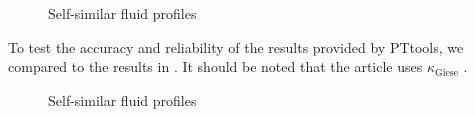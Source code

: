 \begin{figure}[h!]
\centering
{}
\caption{Self-similar fluid profiles}
\label{fig:fluid_profiles}
\end{figure}

To test the accuracy and reliability of the results provided by PTtools,
we compared to the results in \cite[fig. 2]{giese_2021}.
It should be noted that the article uses $\kappa_\text{Giese}$ .

\begin{figure}[h!]
\centering
{}
\caption{Self-similar fluid profiles}
\label{fig:kappa_giese}
\end{figure}

